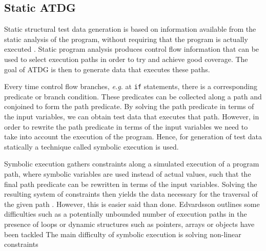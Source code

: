 \documentclass[a4paper,11pt,titlepage]{report}
\begin{document}

\subsection{Static ATDG}
Static structural test data generation is based on information available from the static analysis of the program, without requiring that the program is actually executed \cite{mcminn2004search}. Static program analysis produces control flow information that can be used to select execution paths in order to try and achieve good coverage. The goal of ATDG is then to generate data that executes these paths.

Every time control flow branches, \emph{e.g.} at \texttt{if} statements, there is a corresponding predicate or branch condition. These predicates can be collected along a path and conjoined to form the path predicate. By solving the path predicate in terms of the input variables, we can obtain test data that executes that path. However, in order to rewrite the path predicate in terms of the input variables we need to take into account the execution of the program. Hence, for generation of test data statically a technique called symbolic execution \cite{king1976symbolic} is used.

Symbolic execution gathers constraints along a simulated execution of a program path, where symbolic variables are used instead of actual values, such that the final path predicate can be rewritten in terms of the input variables. Solving the resulting system of constraints then yields the data necessary for the traversal of the given path \cite{king1976symbolic}. %
However, this is easier said than done. Edvardsson outlines some difficulties such as a potentially unbounded number of execution paths in the presence of loops or dynamic structures such as pointers, arrays or objects %
  \cite{edvardsson1999survey} have been tackled The main difficulty of symbolic execution is solving non-linear constraints \cite{tahbildar2automated}

\end{document}
